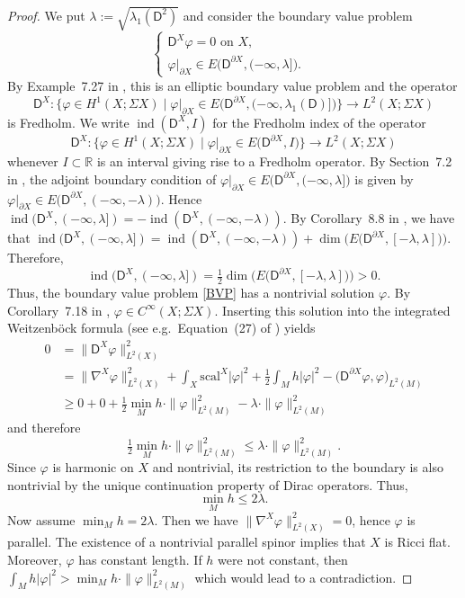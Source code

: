\documentclass[11pt,reqno]{amsart}
\newcommand{\R}{\mathbb{R}}
\newcommand{\dX}{{\partial X}}
\newcommand{\D}{\mathsf{D}}
\renewcommand{\phi}{\varphi}
\newcommand{\scal}{\mathrm{scal}}
\newcommand{\<}{\langle}
\renewcommand{\>}{\rangle}
\DeclareMathOperator{\ind}{\mathrm{ind}}
\theoremstyle{definition}
\begin{document}
\begin{proof}
We put $\lambda:=\sqrt{\lambda_1(\D^2)}$ and consider the boundary value problem
\begin{equation}
\begin{cases}
\D^X\phi = 0 \text{ on }X,&\\
\phi|_\dX \in E\big(\D^\dX,(-\infty,\lambda]\big). &
\end{cases}
\label{BVP}
\end{equation}
By Example~7.27 in \cite{BB}, this is an elliptic boundary value problem and the operator
$$
\D^X\colon \{\phi\in H^1(X;\Sigma X) \mid \phi|_\dX \in E\big(\D^\dX,(-\infty,\lambda_1(\D)]\big)\} \to L^2(X;\Sigma X)
$$
is Fredholm.
We write $\ind(\D^X,I)$ for the Fredholm index of the operator 
$$
\D^X\colon \{\phi\in H^1(X;\Sigma X) \mid \phi|_\dX \in E\big(\D^\dX,I\big)\} \to L^2(X;\Sigma X)
$$ 
whenever $I\subset\R$ is an interval giving rise to a Fredholm operator.
By Section~7.2 in \cite{BB}, the adjoint boundary condition of $\phi|_\dX \in E\big(\D^\dX,(-\infty,\lambda]\big)$ is given by $\phi|_\dX \in E\big(\D^\dX,(-\infty,-\lambda)\big)$.
Hence $\ind(\D^X,(-\infty,\lambda])= -\ind(\D^X,(-\infty,-\lambda))$.
By Corollary~8.8 in \cite{BB}, we have that $\ind(\D^X,(-\infty,\lambda])=\ind(\D^X,(-\infty,-\lambda))+\dim\Big(E\big(\D^\dX,[-\lambda,\lambda]\big)\Big)$.
Therefore, 
$$
\ind(\D^X,(-\infty,\lambda]) = \tfrac12 \dim\Big(E\big(\D^\dX,[-\lambda,\lambda]\big)\Big)>0.
$$
Thus, the boundary value problem \eqref{BVP} has a nontrivial solution $\phi$.
By Corollary~7.18 in \cite{BB}, $\phi\in C^\infty(X;\Sigma X)$.
Inserting this solution into the integrated Weitzenböck formula (see e.g.\ Equation~(27) of \cite{BB2}) yields
\begin{align*}
0 
&=
\|\D^X\phi\|_{L^2(X)}^2 \\
&=
\|\nabla^X\phi\|_{L^2(X)}^2 + \int_X \scal^X |\phi|^2 + \tfrac12 \int_M h |\phi|^2 - \big(\D^\dX \phi,\phi\big)_{L^2(M)} \\
&\ge
0 + 0 + \tfrac12 \min_M h\cdot \|\phi\|_{L^2(M)}^2 - \lambda\cdot\|\phi\|_{L^2(M)}^2 
\end{align*}
and therefore
\[
\tfrac12 \min_M h\cdot \|\phi\|_{L^2(M)}^2 \le \lambda\cdot\|\phi\|_{L^2(M)}^2 .
\]
Since $\phi$ is harmonic on $X$ and nontrivial, its restriction to the boundary is also nontrivial by the unique continuation property of Dirac operators.
Thus, 
\[
\min_M h \le 2\lambda.
\]
Now assume $\min_M h = 2\lambda$.
Then we have $\|\nabla^X\phi\|_{L^2(X)}^2=0$, hence $\phi$ is parallel.
The existence of a nontrivial parallel spinor implies that $X$ is Ricci flat.
Moreover, $\phi$ has constant length.
If $h$ were not constant, then $\int_M h |\phi|^2 > \min_M h\cdot \|\phi\|_{L^2(M)}^2$ which would lead to a contradiction.
\end{proof}
\end{document}
